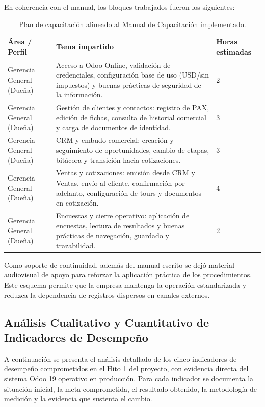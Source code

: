 En coherencia con el manual, los bloques trabajados fueron los siguientes:

\begin{table}[htbp]
\centering
\renewcommand{\arraystretch}{1.25}
\begin{tabular}{|p{3.4cm}|p{8.0cm}|p{1.7cm}|}
\hline
\textbf{Área / Perfil} & \textbf{Tema impartido} & \textbf{Horas estimadas} \\ \hline
Gerencia General (Dueña) & Acceso a Odoo Online, validación de credenciales, configuración base de uso (USD/sin impuestos) y buenas prácticas de seguridad de la información. & 2 \\ \hline
Gerencia General (Dueña) & Gestión de clientes y contactos: registro de PAX, edición de fichas, consulta de historial comercial y carga de documentos de identidad. & 3 \\ \hline
Gerencia General (Dueña) & CRM y embudo comercial: creación y seguimiento de oportunidades, cambio de etapas, bitácora y transición hacia cotizaciones. & 3 \\ \hline
Gerencia General (Dueña) & Ventas y cotizaciones: emisión desde CRM y Ventas, envío al cliente, confirmación por adelanto, configuración de tours y documentos en cotización. & 4 \\ \hline
Gerencia General (Dueña) & Encuestas y cierre operativo: aplicación de encuestas, lectura de resultados y buenas prácticas de navegación, guardado y trazabilidad. & 2 \\ \hline
\end{tabular}
\caption{Plan de capacitación alineado al Manual de Capacitación implementado.}
\end{table}

Como soporte de continuidad, además del manual escrito se dejó material audiovisual de apoyo
para reforzar la aplicación práctica de los procedimientos. Este esquema permite que la
empresa mantenga la operación estandarizada y reduzca la dependencia de registros dispersos en
canales externos.

\newpage
\subsection{Análisis Cualitativo y Cuantitativo de Indicadores de Desempeño}

A continuación se presenta el análisis detallado de los cinco indicadores de desempeño comprometidos en el Hito 1 del proyecto, con evidencia directa del sistema Odoo 19 operativo en producción. Para cada indicador se documenta la situación inicial, la meta comprometida, el resultado obtenido, la metodología de medición y la evidencia que sustenta el cambio.

